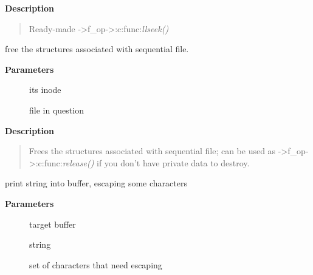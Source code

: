 \documentclass[a4paper,8pt,english]{sphinxmanual}
\begin{document}
\textbf{Description}
\begin{quote}

Ready-made -\textgreater{}f\_op-\textgreater{}:c:func:\emph{llseek()}
\end{quote}

\begin{fulllineitems}
\label{filesystems/index:c.seq_release}
free the structures associated with sequential file.

\end{fulllineitems}


\textbf{Parameters}
\begin{description}
\item[{}] \leavevmode
its inode

\item[{}] \leavevmode
file in question

\end{description}

\textbf{Description}
\begin{quote}

Frees the structures associated with sequential file; can be used
as -\textgreater{}f\_op-\textgreater{}:c:func:\emph{release()} if you don't have private data to destroy.
\end{quote}

\begin{fulllineitems}
\label{filesystems/index:c.seq_escape}
print string into buffer, escaping some characters

\end{fulllineitems}


\textbf{Parameters}
\begin{description}
\item[{}] \leavevmode
target buffer

\item[{}] \leavevmode
string

\item[{}] \leavevmode
set of characters that need escaping

\end{description}
\end{document}
